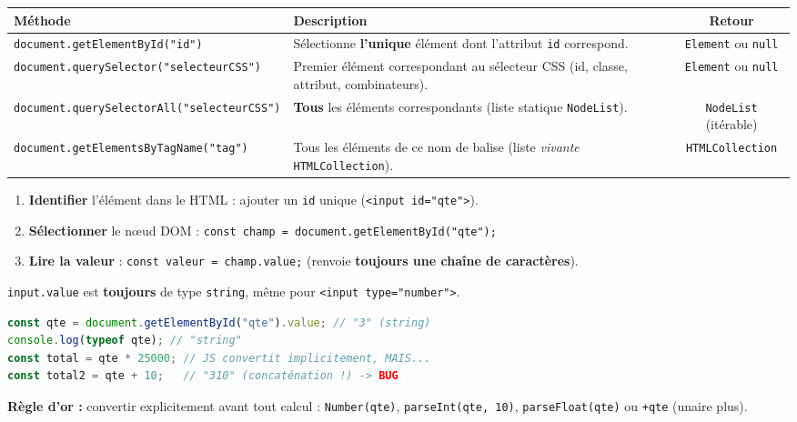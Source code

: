 \documentclass[11pt]{article}
\begin{document}
\begin{propriete}
\begin{center}
\begin{tabularx}{\linewidth}{|l|X|c|}
\hline
\rowcolor{popblueL}
\textbf{Méthode} & \textbf{Description} & \textbf{Retour} \\
\hline
\texttt{document.getElementById("id")} & Sélectionne \textbf{l'unique} élément dont l'attribut \texttt{id} correspond. & \texttt{Element} ou \texttt{null} \\
\hline
\texttt{document.querySelector("selecteurCSS")} & Premier élément correspondant au sélecteur CSS (id, classe, attribut, combinateurs). & \texttt{Element} ou \texttt{null} \\
\hline
\texttt{document.querySelectorAll("selecteurCSS")} & \textbf{Tous} les éléments correspondants (liste statique \texttt{NodeList}). & \texttt{NodeList} (itérable) \\
\hline
\texttt{document.getElementsByTagName("tag")} & Tous les éléments de ce nom de balise (liste \emph{vivante} \texttt{HTMLCollection}). & \texttt{HTMLCollection} \\
\hline
\end{tabularx}
\end{center}
\end{propriete}

\begin{methode}
\begin{enumerate}
    \item \textbf{Identifier} l'élément dans le HTML : ajouter un \texttt{id} unique (\texttt{<input id="qte">}).
    \item \textbf{Sélectionner} le nœud DOM : \texttt{const champ = document.getElementById("qte");}
    \item \textbf{Lire la valeur} : \texttt{const valeur = champ.value;} (renvoie \textbf{toujours une chaîne de caractères}).
\end{enumerate}
\end{methode}

\begin{attention}
\texttt{input.value} est \textbf{toujours} de type \texttt{string}, même pour \texttt{<input type="number">}.
\begin{lstlisting}[language=JavaScript]
const qte = document.getElementById("qte").value; // "3" (string)
console.log(typeof qte); // "string"
const total = qte * 25000; // JS convertit implicitement, MAIS...
const total2 = qte + 10;   // "310" (concaténation !) -> BUG
\end{lstlisting}
\textbf{Règle d'or :} convertir explicitement avant tout calcul : \texttt{Number(qte)}, \texttt{parseInt(qte, 10)}, \texttt{parseFloat(qte)} ou \texttt{+qte} (unaire plus).
\end{attention}
\end{document}
